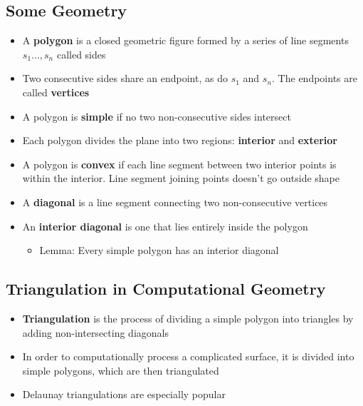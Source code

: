 \documentclass{article}[18pt]
\begin{document}
\subsection{Some Geometry}
\begin{itemize}
\item A \textbf{polygon} is a closed geometric figure formed by a series of line segments $s_1...,s_n$ called sides
\item Two consecutive sides share an endpoint, as do $s_1$ and $s_n$. The endpoints are called \textbf{vertices}
\item A polygon is \textbf{simple} if no two non-consecutive sides intersect
\item Each polygon divides the plane into two regions: \textbf{interior} and \textbf{exterior}
\item A polygon is \textbf{convex} if each line segment between two interior points is within the interior. Line segment joining points doesn't go outside shape
\item A \textbf{diagonal} is a line segment connecting two non-consecutive vertices
\item An \textbf{interior diagonal} is one that lies entirely inside the polygon\begin{itemize}
\item Lemma: Every simple polygon has an interior diagonal 
\end{itemize} 
\end{itemize}
\subsection{Triangulation in Computational Geometry}
\begin{itemize}
\item \textbf{Triangulation} is the process of dividing a simple polygon into triangles by adding non-intersecting diagonals
\item In order to computationally process a complicated surface, it is divided into simple polygons, which are then triangulated
\item Delaunay triangulations are especially popular

\end{itemize}
\end{document}
